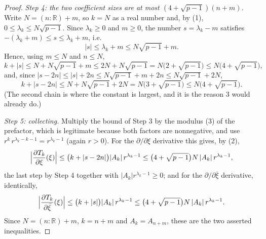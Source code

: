\begin{proof}
\emph{Step 4: the two coefficient sizes are at most
$(4+\sqrt{p-1})(n+m)$.}  Write $N=(n:\mathbb{R})+m$, so $k=N$ as a real number
and, by (1), $0\le\lambda_k\le N\sqrt{p-1}$.  Since $\lambda_k\ge0$ and
$m\ge0$, the number $s=\lambda_k-m$ satisfies
$-(\lambda_k+m)\le s\le\lambda_k+m$, i.e.
\begin{equation}\tag{5}
  |s|\le\lambda_k+m\le N\sqrt{p-1}+m .
\end{equation}
Hence, using $m\le N$ and $n\le N$,
\[
  k+|s|\le N+N\sqrt{p-1}+m\le 2N+N\sqrt{p-1}
  =N\bigl(2+\sqrt{p-1}\bigr)\le N\bigl(4+\sqrt{p-1}\bigr),
\]
and, since $|s-2n|\le|s|+2n\le N\sqrt{p-1}+m+2n\le N\sqrt{p-1}+2N$,
\[
  k+|s-2n|\le N+N\sqrt{p-1}+2N=N\bigl(3+\sqrt{p-1}\bigr)
  \le N\bigl(4+\sqrt{p-1}\bigr).
\]
(The second chain is where the constant is largest, and it is the reason $3$
would already do.)

\emph{Step 5: collecting.}  Multiply the bound of Step 3 by the modulus (3) of
the prefactor, which is legitimate because both factors are nonnegative, and
use $r^{k}\,r^{\lambda_k-k-1}=r^{\lambda_k-1}$ (again $r>0$).  For the
$\partial/\partial\xi$ derivative this gives, by (2),
\[
  \Bigl|\frac{\partial T_k}{\partial\xi}(\xi)\Bigr|
  \le\bigl(k+|s-2n|\bigr)|A_k|\,r^{\lambda_k-1}
  \le\bigl(4+\sqrt{p-1}\bigr)N\,|A_k|\,r^{\lambda_k-1},
\]
the last step by Step 4 together with $|A_k|r^{\lambda_k-1}\ge0$; and for the
$\partial/\partial\bar\xi$ derivative, identically,
\[
  \Bigl|\frac{\partial T_k}{\partial\bar\xi}(\xi)\Bigr|
  \le\bigl(k+|s|\bigr)|A_k|\,r^{\lambda_k-1}
  \le\bigl(4+\sqrt{p-1}\bigr)N\,|A_k|\,r^{\lambda_k-1}.
\]
Since $N=(n:\mathbb{R})+m$, $k=n+m$ and $A_k=A_{n+m}$, these are the two
asserted inequalities.
\end{proof}
